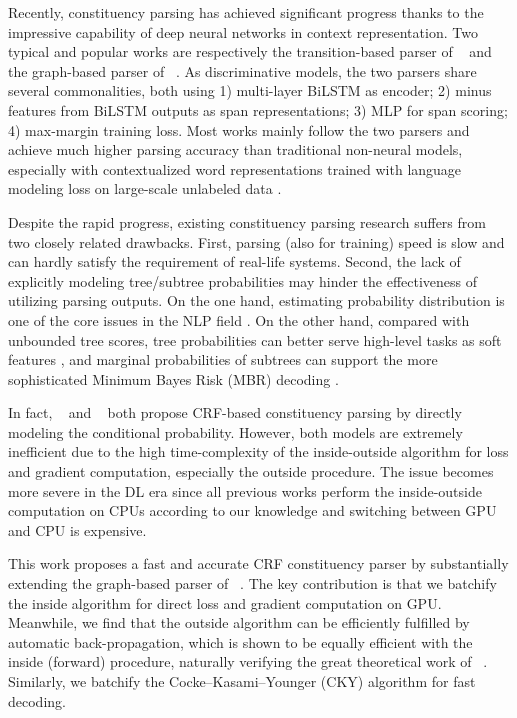 \documentclass{article}
\begin{document}
Recently, constituency parsing has achieved significant progress thanks to the impressive capability of deep neural networks in context representation.
Two typical and popular works are respectively the transition-based parser of \citeauthor{cross-huang-2016-span}~ and the graph-based parser of \citeauthor{stern-etal-2017-minimal}~.
As discriminative models, the two parsers share several commonalities, both using 1) multi-layer BiLSTM as encoder; 2) minus features from BiLSTM outputs as span representations; 3) MLP for span scoring; 4) max-margin training loss.
Most works \cite{gaddy-etal-2018-whats,kitaev-klein-2018-constituency} mainly follow the two parsers and achieve much higher parsing accuracy than traditional non-neural models, especially with contextualized word representations trained with language modeling loss on large-scale unlabeled data \cite{peters-etal-2018-deep,devlin-etal-2019-bert}.

Despite the rapid progress, existing constituency parsing research suffers from two closely related drawbacks. First, parsing (also for training) speed is slow and can hardly satisfy the requirement of real-life systems.
Second, the lack of explicitly modeling tree/subtree probabilities may hinder the effectiveness of utilizing parsing outputs.
On the one hand, estimating probability distribution is one of the core issues in the NLP field \cite{le-zuidema-2014-inside}. On the other hand, compared with unbounded tree scores, tree probabilities can better serve high-level tasks as soft features \cite{jin-etal-2020-relation},
and marginal probabilities of subtrees can support
the more sophisticated Minimum Bayes Risk (MBR) decoding \cite{smith-smith-2007-probabilistic}.

In fact, \citeauthor{finkel-etal-2008-efficient}~ and \citeauthor{durrett-klein-2015-neural}~ both propose CRF-based constituency parsing by directly modeling the conditional probability. However, both models are extremely inefficient due to
the high time-complexity of the inside-outside algorithm for loss and gradient computation, especially the outside procedure.
The issue becomes more severe in the DL era since all previous works perform the inside-outside computation on CPUs according to our knowledge and switching between GPU and CPU is expensive.




This work proposes a fast and accurate CRF constituency parser by substantially extending the graph-based parser of \citeauthor{stern-etal-2017-minimal}~. The key contribution is that we batchify the inside algorithm for direct loss and gradient computation on GPU. Meanwhile, we find that the outside algorithm can be efficiently fulfilled by automatic back-propagation, which is shown to be equally efficient with the inside (forward) procedure, naturally verifying the great theoretical work of \citeauthor{eisner-2016-inside}~.
Similarly, we batchify the Cocke–Kasami–Younger (CKY) algorithm for fast decoding.
\end{document}
